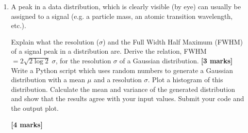 \begin{enumerate}
\item A peak in a data distribution, which is clearly visible (by eye) can usually be assigned to a signal (e.g. a particle mass, an atomic transition wavelength, etc.).

Explain what the resolution ($\sigma$) and the Full Width Half Maximum (FWHM) of a signal peak in a distribution are.
Derive the relation, FWHM$ = 2 \sqrt{2 \log 2}\; \sigma$, for the resolution $\sigma$ of a Gaussian distribution.
\hfill {\bf [3 marks]}\\

Write a Python script which uses random numbers to generate a Gaussian distribution with a mean $\mu$ and a resolution $\sigma$.
Plot a histogram of this distribution.
Calculate the mean and variance of the generated distribution and show that the results agree with your input values.
Submit your code and the output plot.

\hfill {\bf [4 marks]}



\begin{comment}
\item Write a short Python script which generates a flat distribution and plots a histogram of the distribution.
Calculate the mean and variance of the generated distribution and show that for a flat distribution between $a$ and $b$, the relation $\sigma = \frac{b-a}{\sqrt{12}}$ for the resolution $\sigma$ is satisfied.
You need to submit your code.

Derive the relation $\sigma = \frac{b-a}{\sqrt{12}}$ for the resolution $\sigma$ of a flat distribution between $a$ and $b$.

\hfill {\bf [6 marks]}
\end{comment}

\end{enumerate}
